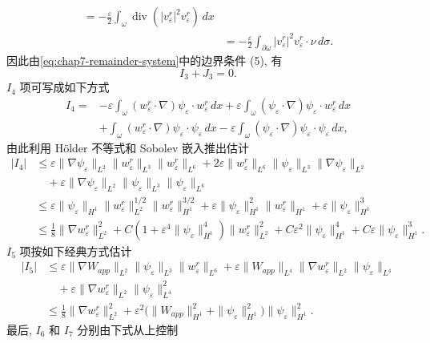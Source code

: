 \begin{sloppypar}
{\[\begin{split}
 =-\frac\varepsilon2\int_\omega\operatorname{div}(|v_\varepsilon^r|^2v_\varepsilon^r)\,dx\\
 &=-\frac\varepsilon2\int_{\partial\omega}|v_\varepsilon^r|^2v_\varepsilon^r\cdot\nu\,d\sigma.
\end{split}
\]
因此由\eqref{eq:chap7-remainder-system}中的边界条件 (5), 有
\[
 I_3+J_3=0.
\]
$I_4$ 项可写成如下方式
\[
\begin{split}
 I_4={}&-\varepsilon\int_\omega(w_\varepsilon^r\cdot\nabla)\psi_\varepsilon\cdot w_\varepsilon^r\,dx
 +\varepsilon\int_\omega(\psi_\varepsilon\cdot\nabla)\psi_\varepsilon\cdot w_\varepsilon^r\,dx\\
 &+\int_\omega(w_\varepsilon^r\cdot\nabla)\psi_\varepsilon\cdot\psi_\varepsilon\,dx
 -\varepsilon\int_\omega(\psi_\varepsilon\cdot\nabla)\psi_\varepsilon\cdot\psi_\varepsilon\,dx,
\end{split}
\]
由此利用 Hölder 不等式和 Sobolev 嵌入推出估计
\[
\begin{split}
 |I_4|&\leq\varepsilon\|\nabla\psi_\varepsilon\|_{L^2}\|w_\varepsilon^r\|_{L^3}\|w_\varepsilon^r\|_{L^6}
 +2\varepsilon\|w_\varepsilon^r\|_{L^6}\|\psi_\varepsilon\|_{L^3}\|\nabla\psi_\varepsilon\|_{L^2}\\
 &\quad+\varepsilon\|\nabla\psi_\varepsilon\|_{L^2}\|\psi_\varepsilon\|_{L^3}\|\psi_\varepsilon\|_{L^6}\\
 &\leq\varepsilon\|\psi_\varepsilon\|_{H^1}\|w_\varepsilon^r\|_{L^2}^{1/2}
 \|w_\varepsilon^r\|_{H^1}^{3/2}
 +\varepsilon\|\psi_\varepsilon\|_{H^1}^2\|w_\varepsilon^r\|_{H^1}
 +\varepsilon\|\psi_\varepsilon\|_{H^1}^3\\
 &\leq\frac18\|\nabla w_\varepsilon^r\|_{L^2}^2
 +C(1+\varepsilon^4\|\psi_\varepsilon\|_{H^1}^4)\|w_\varepsilon^r\|_{L^2}^2
 +C\varepsilon^2\|\psi_\varepsilon\|_{H^1}^4
 +C\varepsilon\|\psi_\varepsilon\|_{H^1}^3.
\end{split}
\]
$I_5$ 项按如下经典方式估计
\[
\begin{split}
 |I_5|&\leq\varepsilon\|\nabla W_{app}\|_{L^2}\|\psi_\varepsilon\|_{L^3}\|w_\varepsilon^r\|_{L^6}
 +\varepsilon\|W_{app}\|_{L^4}\|\nabla w_\varepsilon^r\|_{L^2}\|\psi_\varepsilon\|_{L^4}\\
 &\quad+\varepsilon\|\nabla w_\varepsilon^r\|_{L^2}\|\psi_\varepsilon\|_{L^4}^2\\
 &\leq\frac18\|\nabla w_\varepsilon^r\|_{L^2}^2
 +\varepsilon^2\bigl(\|W_{app}\|_{H^1}^2+\|\psi_\varepsilon\|_{H^1}^2\bigr)
 \|\psi_\varepsilon\|_{H^1}^2.
\end{split}
\]
最后, $I_6$ 和 $I_7$ 分别由下式从上控制
}
\end{sloppypar}
